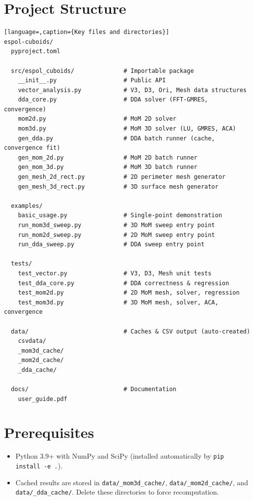 \documentclass[a4paper,11pt]{article}
\begin{document}
\section{Project Structure}

\begin{lstlisting}[language=,caption={Key files and directories}]
espol-cuboids/
  pyproject.toml

  src/espol_cuboids/              # Importable package
    __init__.py                   # Public API
    vector_analysis.py            # V3, D3, Ori, Mesh data structures
    dda_core.py                   # DDA solver (FFT-GMRES, convergence)
    mom2d.py                      # MoM 2D solver
    mom3d.py                      # MoM 3D solver (LU, GMRES, ACA)
    gen_dda.py                    # DDA batch runner (cache, convergence fit)
    gen_mom_2d.py                 # MoM 2D batch runner
    gen_mom_3d.py                 # MoM 3D batch runner
    gen_mesh_2d_rect.py           # 2D perimeter mesh generator
    gen_mesh_3d_rect.py           # 3D surface mesh generator

  examples/
    basic_usage.py                # Single-point demonstration
    run_mom3d_sweep.py            # 3D MoM sweep entry point
    run_mom2d_sweep.py            # 2D MoM sweep entry point
    run_dda_sweep.py              # DDA sweep entry point

  tests/
    test_vector.py                # V3, D3, Mesh unit tests
    test_dda_core.py              # DDA correctness & regression
    test_mom2d.py                 # 2D MoM mesh, solver, regression
    test_mom3d.py                 # 3D MoM mesh, solver, ACA, convergence

  data/                           # Caches & CSV output (auto-created)
    csvdata/
    _mom3d_cache/
    _mom2d_cache/
    _dda_cache/

  docs/                           # Documentation
    user_guide.pdf
\end{lstlisting}

\section{Prerequisites}

\begin{itemize}
    \item Python 3.9+ with NumPy and SciPy (installed automatically by
          \texttt{pip install -e .}).
    \item Cached results are stored in \texttt{data/\_mom3d\_cache/},
          \texttt{data/\_mom2d\_cache/}, and \texttt{data/\_dda\_cache/}.
          Delete these directories to force recomputation.
\end{itemize}
\end{document}

